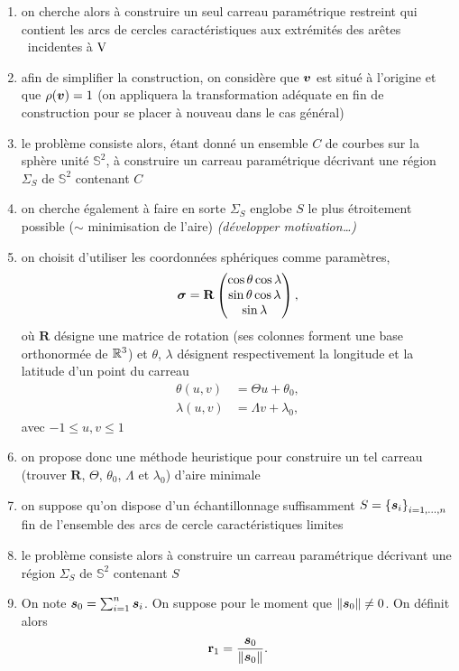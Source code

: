 \begin{enumerate}
	\item on cherche alors à construire un seul carreau paramétrique restreint qui contient les arcs de cercles caractéristiques aux extrémités des arêtes \brep\ incidentes à $\mathrm{V}$
	\item afin de simplifier la construction, on considère que $\bm{v}$ est situé à l'origine et que $\rho(\bm{v}) = 1$ (on appliquera la transformation adéquate en fin de construction pour se placer à nouveau dans le cas général)
	\item le problème consiste alors, étant donné un ensemble $C$ de courbes sur la sphère unité $\mathbb{S}^2$, à construire un carreau paramétrique décrivant une région $\Sigma_S$ de $\mathbb{S}^2$ contenant $C$
	\item on cherche également à faire en sorte $\Sigma_S$ englobe $S$ le plus étroitement possible ($\sim$ minimisation de l'aire) \textit{(développer motivation\ldots)}
	
	\item on choisit d'utiliser les coordonnées sphériques comme paramètres, \ie
	\begin{equation}
	    \bm{\sigma} = \mathbf{R} 
	    \begin{pmatrix}
		    \cos \theta \cos \lambda \\
		    \sin \theta \cos \lambda \\
		    \sin \lambda \\
	    \end{pmatrix},
	\end{equation}
	où $\mathbf{R}$ désigne une matrice de rotation (\ie ses colonnes forment une base orthonormée de $\mathbb{R}^3$) et $\theta$, $\lambda$ désignent respectivement la longitude et la latitude d'un point du carreau
	\begin{align*}
	    \theta(u,v)  &= \Theta u + \theta_0, \\
	    \lambda(u,v) &= \Lambda v + \lambda_0,
	\end{align*}
	avec $-1 \leq u, v \leq 1$


	\item on propose donc une méthode heuristique pour construire un tel carreau (\ie trouver $\mathbf{R}$, $\Theta$, $\theta_0$, $\Lambda$ et $\lambda_0$) d'aire minimale
	\item on suppose qu'on dispose d'un échantillonnage suffisamment $S = \left\{{\bm{s}}_{i}\right\}_{{i}={1},\ldots,{n}}$ fin de l'ensemble des arcs de cercle caractéristiques limites
	\item le problème consiste alors à construire un carreau paramétrique décrivant une région $\Sigma_S$ de $\mathbb{S}^2$ contenant $S$
	
	\item On note $\bm{s}_{0} = \sum_{i = 1}^n \bm{s}_i$. 
	On suppose pour le moment que $\left\| {\bm{s}_{0}} \right\| \neq 0$. 
	On définit alors 
	\begin{equation}
	    \mathbf{r}_1 = \frac{ \bm{s}_{0} }{\left\| { \bm{s}_{0} } \right\|}.
	\end{equation}
\end{enumerate}	

